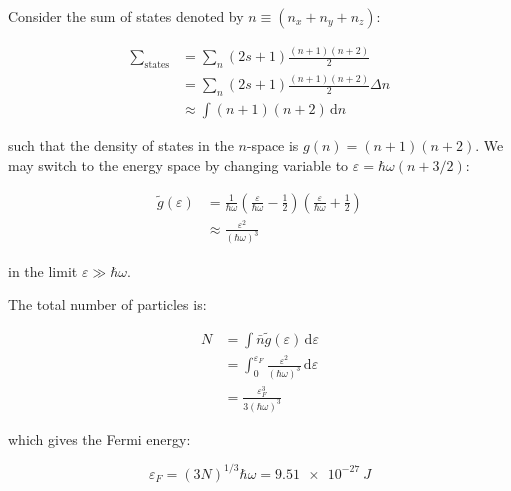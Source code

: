 \documentclass[12pt]{article}
\begin{document}
Consider the sum of states denoted by $n \equiv (n_{x} + n_{y} + n_{z})$:

\begin{equation}
    \begin{split}
        \sum_{\text{states}} &= \sum_{n} (2s + 1) \frac{(n + 1)(n + 2)}{2} \\
        &= \sum_{n} (2s + 1) \frac{(n + 1)(n + 2)}{2} \Delta n \\
        &\approx \int (n + 1)(n + 2) \, \mathrm{d}n
    \end{split}
\end{equation}

such that the density of states in the $n$-space is $g(n) = (n + 1)(n + 2)$. We may switch to the energy space by changing variable to $\varepsilon = \hbar \omega (n + 3/2)$:

\begin{equation}
    \begin{split}
        \tilde{g}(\varepsilon) &= \frac{1}{\hbar \omega} \left( \frac{\varepsilon}{\hbar \omega} - \frac{1}{2} \right) \left( \frac{\varepsilon}{\hbar \omega} + \frac{1}{2} \right) \\
        &\approx \frac{\varepsilon^{2}}{(\hbar \omega)^{3}}
    \end{split}
\end{equation}

in the limit $\varepsilon \gg \hbar \omega$.

The total number of particles is:

\begin{equation}
    \begin{split}
        N &= \int \bar{n} \tilde{g}(\varepsilon) \, \mathrm{d}\varepsilon \\
        &= \int_{0}^{\varepsilon_{F}} \frac{\varepsilon^{2}}{(\hbar \omega)^{3}} \, \mathrm{d}\varepsilon \\
        &= \frac{\varepsilon_{F}^{3}}{3(\hbar \omega)^{3}}
    \end{split}
\end{equation}

which gives the Fermi energy:

\begin{equation}
    \varepsilon_{F} = (3N)^{1/3} \hbar \omega = \qty{9.51e-27}{J}
\end{equation}
\end{document}

